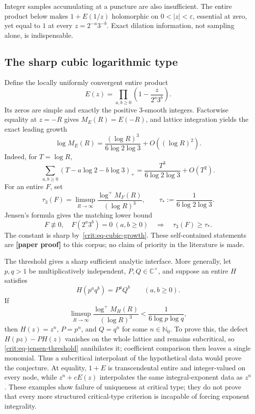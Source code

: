 \documentclass[11pt,oneside]{article}
\theoremstyle{definition}
\theoremstyle{remark}
\newcommand{\Nzero}{\mathbb N_0}
\newcommand{\C}{\mathbb C}
\newcommand{\statusnew}{\textcolor{newgreen}{\textbf{[paper proof]}}}
\begin{document}
Integer samples accumulating at a puncture are also insufficient.  The entire product below
makes $1+E(1/z)$ holomorphic on $0<|z|<\varepsilon$, essential at zero, yet equal to $1$ at
every $z=2^{-a}3^{-b}$.  Exact dilation information, not sampling alone, is indispensable.

\subsection{The sharp cubic logarithmic type}
\label{crit:canonical-product}

Define the locally uniformly convergent entire product
\begin{equation}
 E(z)=\prod_{a,b\ge0}\left(1-\frac{z}{2^a3^b}\right).
 \label{crit:eq-canonical-product}
\end{equation}
Its zeros are simple and exactly the positive $3$-smooth integers.  Factorwise equality at
$z=-R$ gives $M_E(R)=E(-R)$, and lattice integration yields the exact leading growth
\begin{equation}
 \log M_E(R)=\frac{(\log R)^3}{6\log2\log3}+O((\log R)^2).
 \label{crit:eq-cubic-growth}
\end{equation}
Indeed, for $T=\log R$,
\[
 \sum_{a,b\ge0}(T-a\log2-b\log3)_+
 =\frac{T^3}{6\log2\log3}+O(T^2).
\]
For an entire $F$, set
\[
 \tau_3(F)=\limsup_{R\to\infty}
 \frac{\log^+M_F(R)}{(\log R)^3},\qquad
 \tau_*:=\frac1{6\log2\log3}.
\]
Jensen's formula gives the matching lower bound
\begin{equation}
 F\not\equiv0,\quad F(2^a3^b)=0\ (a,b\ge0)
 \quad\Longrightarrow\quad \tau_3(F)\ge\tau_*.
 \label{crit:eq-jensen-threshold}
\end{equation}
The constant is sharp by~\eqref{crit:eq-cubic-growth}.  These self-contained statements are
\statusnew{} to this corpus; no claim of priority in the literature is made.

The threshold gives a sharp sufficient analytic interface.  More generally, let $p,q>1$
be multiplicatively independent, $P,Q\in\C^\times$, and suppose an entire $H$ satisfies
\[
 H(p^aq^b)=P^aQ^b\qquad(a,b\ge0).
\]
If
\begin{equation}
 \limsup_{R\to\infty}\frac{\log^+M_H(R)}{(\log R)^3}
 <\frac1{6\log p\log q},
 \label{crit:eq-subcritical}
\end{equation}
then $H(z)=z^n$, $P=p^n$, and $Q=q^n$ for some $n\in\Nzero$.  To prove this, the defect
$H(pz)-PH(z)$ vanishes on the whole lattice and remains subcritical, so
\eqref{crit:eq-jensen-threshold} annihilates it; coefficient comparison then leaves a single
monomial.  Thus a subcritical interpolant of the hypothetical data would prove the
conjecture.  At equality, $1+E$ is transcendental entire and integer-valued on every node,
while $z^n+cE(z)$ interpolates the same integral-exponent data as $z^n$.  These examples show
failure of uniqueness at critical type; they do not prove that every more structured
critical-type criterion is incapable of forcing exponent integrality.
\end{document}

